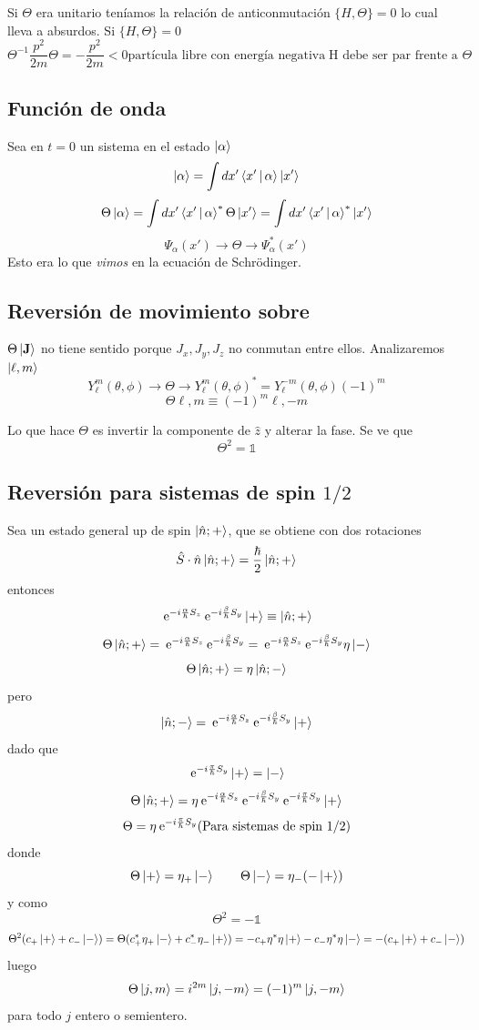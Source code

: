 \documentclass[10pt,oneside]{CBFT_book}
\begin{document}
Si $\Theta$ era unitario teníamos la relación de anticonmutación $\{ H, \Theta \}=0$ 
lo cual lleva a absurdos.
Si $\{ H,\Theta \} = 0$
\[
	\Theta^{-1} \frac{p^2}{2m} \Theta = - \frac{p^2}{2m} < 0
	\text{partícula libre con energía negativa} \; \text{H debe ser par frente a $\Theta$}
\]

\subsection{Función de onda}

Sea en $t=0$ un sistema en el estado $\Ket{\alpha}$
\[
	\Ket{\alpha} = \int dx' \Braket{x'|\alpha} \Ket{x'} 
\]
\[
	\Theta\Ket{\alpha} = \int dx' \Braket{x'|\alpha}^* \Theta \Ket{x'} =
	\int dx' \Braket{x'|\alpha}^* \Ket{x'} 
\]
\[
	\Psi_\alpha (x') \longrightarrow \Theta \longrightarrow \Psi_\alpha^* (x')
\]
Esto era lo que {\it vimos} en la ecuación de Schrödinger.

\subsection{Reversión de movimiento sobre }


$\Theta \Ket{\vb{J}}$ no tiene sentido porque $J_x,J_y,J_z$ no conmutan entre ellos.
Analizaremos $\Ket{\ell,m}$
\[
	Y_\ell^m(\theta,\phi) \longrightarrow\Theta\longrightarrow Y_\ell^m(\theta,\phi)^* =
	Y_\ell^{-m}(\theta,\phi)(-1)^m
\]
\[
	\Theta{\ell,m} \equiv (-1)^m {\ell,-m}
\]

Lo que hace $\Theta$ es invertir la componente de $\hat{z}$ y alterar la fase. Se ve que 
\[
	\Theta^2 = \mathbb{1}
\]

\subsection{Reversión para sistemas de spin $1/2$}

Sea un estado general up de spin $\Ket{\hat{n};+}$, que se obtiene con dos rotaciones 
\[
	\hat{S}\cdot\hat{n} \Ket{\hat{n};+} = \frac{\hbar}{2} \Ket{\hat{n};+}
\]
entonces
\[
	\:\mathrm{e}^{-i\frac{\alpha}{\hbar}S_z}\:\mathrm{e}^{-i\frac{\beta}{\hbar}S_y} \Ket{+} \equiv
	 \Ket{\hat{n};+}
\]
\[
	\Theta \Ket{\hat{n};+} = \:\mathrm{e}^{-i\frac{\alpha}{\hbar}S_z}\:\mathrm{e}^{-i\frac{\beta}{\hbar}S_y} =
	\:\mathrm{e}^{-i\frac{\alpha}{\hbar}S_z}\:\mathrm{e}^{-i\frac{\beta}{\hbar}S_y} \eta\Ket{-}
\]
\[
	\Theta \Ket{\hat{n};+} = \eta \Ket{\hat{n};-}
\]
pero 
\[
	\Ket{\hat{n};-} = \:\mathrm{e}^{-i\frac{\alpha}{\hbar}S_z}\:\mathrm{e}^{-i\frac{\beta}{\hbar}S_y}\Ket{+}
\]
dado que 
\[
	 \:\mathrm{e}^{-i\frac{\pi}{\hbar}S_y} \Ket{+} = \Ket{-}
\]
\[
	\Theta \Ket{\hat{n};+} = \eta \:\mathrm{e}^{-i\frac{\alpha}{\hbar}S_z}\:\mathrm{e}^{-i\frac{\beta}{\hbar}S_y}
	\:\mathrm{e}^{-i\frac{\pi}{\hbar}S_y} \Ket{+}
\]
\[
	\Theta = \eta \:\mathrm{e}^{-i\frac{\pi}{\hbar}S_y} \text{(Para sistemas de spin 1/2)}
\]
donde 
\[
	\Theta\Ket{+} = \eta_+ \Ket{-} \qquad \Theta\Ket{-} = \eta_- (-\Ket{+})
\]
y como
\[
	\Theta^2 = -\mathbb{1}
\]
\[
	\Theta^2 ( c_+\Ket{+} + c_-\Ket{-}) = \Theta ( c_+^*\eta_+\Ket{-} + c_-^*\eta_-\Ket{+}) =
	-c_+\eta^*\eta \Ket{+} - c_-\eta^*\eta \Ket{-} = -( c_+\Ket{+} + c_-\Ket{-})
\]
luego
\[
	\Theta\Ket{j,m} = i^{2m} \Ket{j,-m} = (-1)^m \Ket{j,-m}
\]
para todo $j$ entero o semientero.
\end{document}

